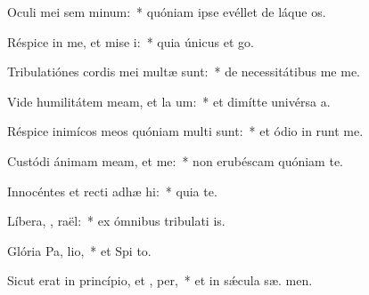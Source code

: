 \item Oculi mei sem  minum:~* quóniam ipse evéllet de láque  os.
\item Réspice in me, et mise i:~* quia únicus et   go.
\item Tribulatiónes cordis mei multæ sunt:~* de necessitátibus me  me.
\item Vide humilitátem meam, et la um:~* et dimítte univérsa  a.
\item Réspice inimícos meos quóniam multi sunt:~* et ódio in runt me.
\item Custódi ánimam meam, et  me:~* non erubéscam quóniam   te.
\item Innocéntes et recti adhæ hi:~* quia  te.
\item Líbera, , raël:~* ex ómnibus tribulati is.
\item Glória Pa,  lio,~* et Spi to.
\item Sicut erat in princípio, et ,  per,~* et in sǽcula sæ. men.
